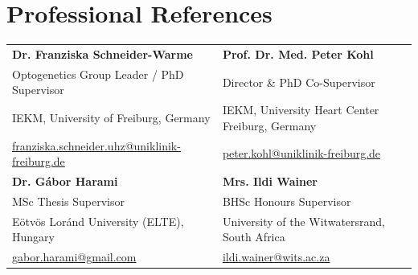 \documentclass[10pt,a4paper]{article}
\begin{document}
\section{Professional References}
\begin{tcolorbox}[colback=bglight, colframe=bordergray, arc=3pt, boxrule=0.5pt, top=4pt, bottom=4pt, left=6pt, right=6pt]
\begin{tabularx}{\textwidth}{@{}X X@{}}
\textbf{Dr. Franziska Schneider-Warme} & \textbf{Prof. Dr. Med. Peter Kohl} \\
\small Optogenetics Group Leader / PhD Supervisor & \small Director \& PhD Co-Supervisor \\
\small IEKM, University of Freiburg, Germany & \small IEKM, University Heart Center Freiburg, Germany \\
\small \href{mailto:franziska.schneider.uhz@uniklinik-freiburg.de}{franziska.schneider.uhz@uniklinik-freiburg.de} & \small \href{mailto:peter.kohl@uniklinik-freiburg.de}{peter.kohl@uniklinik-freiburg.de} \\[8pt]
\textbf{Dr. Gábor Harami} & \textbf{Mrs. Ildi Wainer} \\
\small MSc Thesis Supervisor & \small BHSc Honours Supervisor \\
\small Eötvös Loránd University (ELTE), Hungary & \small University of the Witwatersrand, South Africa \\
\small \href{mailto:gabor.harami@gmail.com}{gabor.harami@gmail.com} & \small \href{mailto:ildi.wainer@wits.ac.za}{ildi.wainer@wits.ac.za}
\end{tabularx}
\end{tcolorbox}
\end{document}
